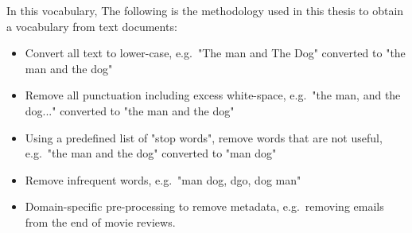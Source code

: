 



  In this vocabulary,   The following is the methodology used in this thesis to obtain a vocabulary from text documents: %

\begin{itemize}
	\item  Convert all text to lower-case, e.g.\ "The man and The Dog" converted to "the man and the dog"
	\item  Remove all punctuation including excess white-space, e.g.\ "the man, and the dog..." converted to "the man and the dog"
	\item Using a predefined list of "stop words", remove words that are not useful, e.g.\ "the man and the dog" converted to "man dog"
	\item Remove infrequent words, e.g.\ "man dog, dgo, dog man" 
	\item Domain-specific pre-processing to remove metadata, e.g.\ removing emails from the end of movie reviews.
\end{itemize}






